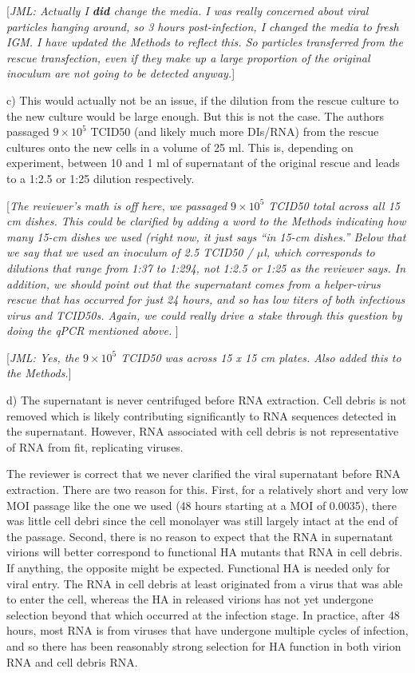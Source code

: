 \documentclass[11pt, oneside]{article}   	%
\newcommand{\comment}[1]{{\color{red}[\textsl{#1}]}}
\newcommand{\response}[1]{{\color{black}#1}}
\begin{document}
\comment{JML: Actually I {\bf did} change the media. I was really concerned about viral particles hanging around, so 3 hours post-infection, I changed the media to fresh IGM. I have updated the Methods to reflect this. So particles transferred from the rescue transfection, even if they make up a large proportion of the original inoculum are not going to be detected anyway.}

c) This would actually not be an issue, if the dilution from the rescue culture to the new culture would be large enough. But this is not the case. The authors passaged $9\times10^5$ TCID50 (and likely much more DIs/RNA) from the rescue cultures onto the new cells in a volume of 25 ml. This is, depending on experiment, between 10 and 1 ml of supernatant of the original rescue and leads to a 1:2.5 or 1:25 dilution respectively. 

\comment{The reviewer's math is off here, we passaged $9\times 10^5$ TCID50 \emph{total} across all 15 cm dishes. 
This could be clarified by adding a word to the Methods indicating how many 15-cm dishes we used (right now, it just says ``in 15-cm dishes.''
Below that we say that we used an inoculum of 2.5 TCID50 / $\mu$l, which corresponds to dilutions that range from 1:37 to 1:294, not 1:2.5 or 1:25 as the reviewer says.
In addition, we should point out that the supernatant comes from a helper-virus rescue that has occurred for just 24 hours, and so has low titers of both infectious virus and TCID50s.
Again, we could really drive a stake through this question by doing the qPCR mentioned above.
}

\comment{JML: Yes, the $9\times 10^5$ TCID50 was across 15 x 15 cm plates. Also added this to the Methods.}

d) The supernatant is never centrifuged before RNA extraction. Cell debris is not removed which is likely contributing significantly to RNA sequences detected in the supernatant. However, RNA associated with cell debris is not representative of RNA from fit, replicating viruses. 

\response{The reviewer is correct that we never clarified the viral supernatant before RNA extraction.
There are two reason for this.
First, for a relatively short and very low MOI passage like the one we used (48 hours starting at a MOI of 0.0035), there was little cell debri since the cell monolayer was still largely intact at the end of the passage.
Second, there is no reason to expect that the RNA in supernatant virions will better correspond to functional HA mutants that RNA in cell debris.
If anything, the opposite might be expected.
Functional HA is needed only for viral entry.
The RNA in cell debris at least originated from a virus that was able to enter the cell, whereas the HA in released virions has not yet undergone selection beyond that which occurred at the infection stage.
In practice, after 48 hours, most RNA is from viruses that have undergone multiple cycles of infection, and so there has been reasonably strong selection for HA function in both virion RNA and cell debris RNA.
}
\end{document}
